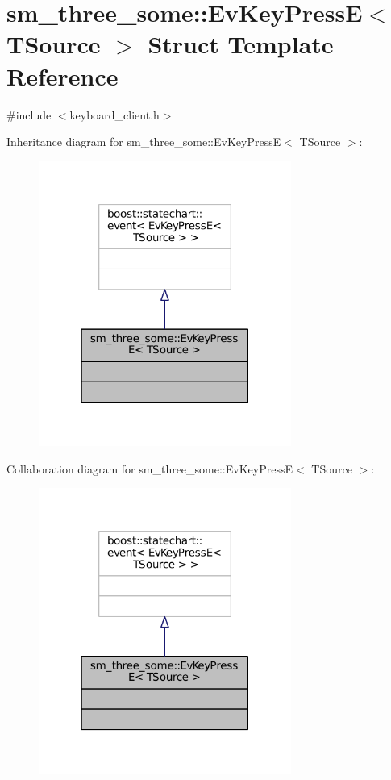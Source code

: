 \hypertarget{structsm__three__some_1_1EvKeyPressE}{}\section{sm\+\_\+three\+\_\+some\+:\+:Ev\+Key\+PressE$<$ T\+Source $>$ Struct Template Reference}
\label{structsm__three__some_1_1EvKeyPressE}


{\ttfamily \#include $<$keyboard\+\_\+client.\+h$>$}



Inheritance diagram for sm\+\_\+three\+\_\+some\+:\+:Ev\+Key\+PressE$<$ T\+Source $>$\+:
\nopagebreak
\begin{figure}[H]
\begin{center}
\leavevmode
\includegraphics[width=235pt]{structsm__three__some_1_1EvKeyPressE__inherit__graph}
\end{center}
\end{figure}


Collaboration diagram for sm\+\_\+three\+\_\+some\+:\+:Ev\+Key\+PressE$<$ T\+Source $>$\+:
\nopagebreak
\begin{figure}[H]
\begin{center}
\leavevmode
\includegraphics[width=235pt]{structsm__three__some_1_1EvKeyPressE__coll__graph}
\end{center}
\end{figure}


